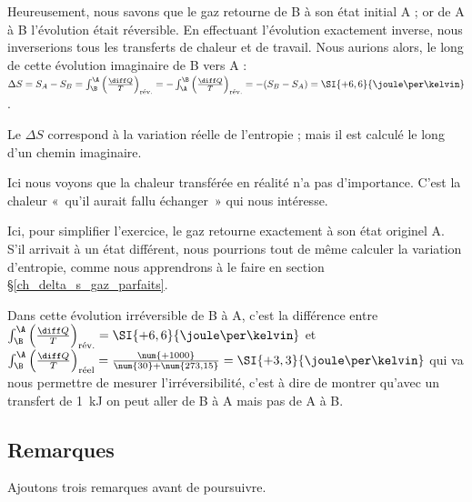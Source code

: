 \begin{anexample}
\begin{answer}
				Heureusement, nous savons que le gaz retourne de B à son état initial A ; or de A à B l’évolution était réversible. En effectuant l’évolution exactement inverse, nous inverserions tous les transferts de chaleur et de travail. Nous aurions alors, le long de cette évolution imaginaire de B vers A : $\Delta S = S_A - S_B 
					= \int_\B^\A \left( \frac{\diff Q}{T} \right)_\text{rév.} 
					= - \int_\A^\B \left( \frac{\diff Q}{T} \right)_\text{rév.}
					= -(S_B - S_A)
					= \SI{+6,6}{\joule\per\kelvin}$. 
						\begin{remark}Le $\Delta S$ correspond à la variation réelle de l’entropie ; mais il est calculé le long d’un chemin imaginaire.\end{remark}
						\begin{remark} Ici nous voyons que la chaleur transférée en réalité n’a pas d’importance. C’est la chaleur «~qu’il aurait fallu échanger~» qui nous intéresse.\end{remark}
						\begin{remark} Ici, pour simplifier l’exercice, le gaz retourne exactement à son état originel A. S’il arrivait à un état différent, nous pourrions tout de même calculer la variation d’entropie, comme nous apprendrons à le faire en section \S\ref{ch_delta_s_gaz_parfaits}.\end{remark}
						\begin{remark}Dans cette évolution irréversible de B à A, c’est la différence entre $\int_\B^\A \left( \frac{\diff Q}{T} \right)_\text{rév.} = \SI{+6,6}{\joule\per\kelvin}$ et $\int_\B^\A \left( \frac{\diff Q}{T} \right)_\text{réel} = \frac{\num{+1000}}{\num{30}+\num{273,15}} =  \SI{+3,3}{\joule\per\kelvin}$ qui va nous permettre de mesurer l’irréversibilité, c’est à dire de montrer qu’avec un transfert de \SI{1}{\kilo\joule} on peut aller de B à A mais pas de A à B.\end{remark}
				\end{answer}
		\end{anexample}

		
	\subsection{Remarques}
	
		Ajoutons trois remarques avant de poursuivre.
		
